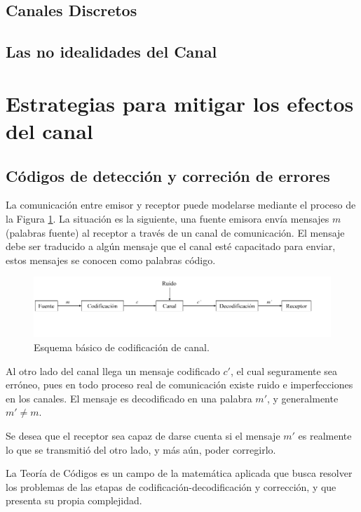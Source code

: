 	\subsection{Canales Discretos}
	\subsection{Las no idealidades del Canal}


\section{Estrategias para mitigar los efectos del canal}

	\subsection{C\'odigos de detecci\'on y correci\'on de errores}

La comunicación entre emisor y receptor puede modelarse mediante el proceso de la Figura \ref{diagrama_codificacion}. La situación es la siguiente, una fuente emisora envía mensajes $m$ (palabras fuente) al receptor a través de un canal de comunicación. El mensaje debe ser traducido a algún mensaje que el canal esté capacitado para enviar, estos mensajes se conocen como palabras código.

\begin{figure}
\centering
\includegraphics[scale=0.45]{figuras/cap02/diagrama_codificacion}
\caption{\label{diagrama_codificacion} Esquema básico de codificación de canal.}
\end{figure}

Al otro lado del canal llega un mensaje codificado $c'$, el cual seguramente sea erróneo, pues en todo proceso real de comunicación existe ruido e imperfecciones en los canales. El mensaje es decodificado en una palabra $m'$, y generalmente $m' \neq m$.

Se desea que el receptor sea capaz de darse cuenta si el mensaje $m'$ es realmente lo que se transmitió del otro lado, y más aún, poder corregirlo. 

La Teoría de Códigos es un campo de la matemática aplicada que busca resolver los problemas de las etapas de codificación-decodificación y corrección, y que presenta su propia complejidad.


